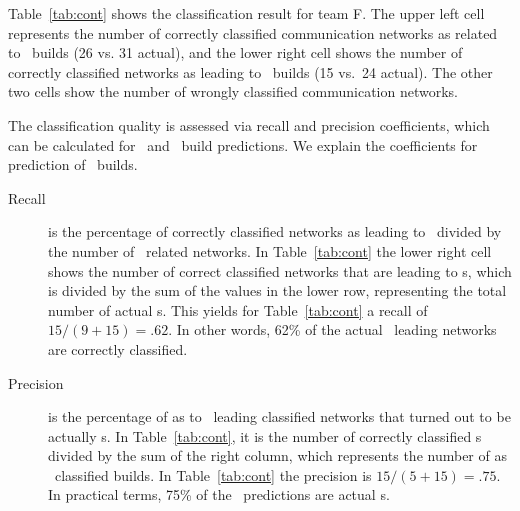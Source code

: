 Table~\ref{tab:cont} shows the classification result for team F. The upper left
cell represents the number of correctly classified communication networks as
related to \ok\ builds (26 vs. 31 actual), and the lower right cell shows the
number of correctly classified networks as leading to \error\ builds (15 vs.~24 actual). The other two cells show the number of wrongly classified communication
networks.

The classification quality is assessed via recall and precision coefficients,
which can be calculated for \error\ and \ok\ build  predictions. We explain the
coefficients for prediction of \error\ builds.

\begin{description}
\item[Recall] is the percentage of correctly classified networks as leading to
\error\ divided by the number of \error\ related networks. In
Table~\ref{tab:cont} the lower right cell shows the number of correct classified
networks that are leading to \error s, which is divided by the sum of the values
in the lower row, representing the total number of actual \error s. This
yields for Table~\ref{tab:cont} a recall of $15/(9+15)=.62$. In other words,
62\% of the actual \error\ leading networks are correctly classified.
 
\item[Precision] is the percentage of as to \error\ leading classified networks
that turned out to be actually \error s. In Table~\ref{tab:cont}, it is the
number of correctly classified \error s divided by the sum of the right column,
which represents the number of as \error\ classified builds. In
Table~\ref{tab:cont} the precision is $15/(5+15)=.75$. In practical terms, 75\%
of the \error\ predictions are actual \error s.
\end{description}





